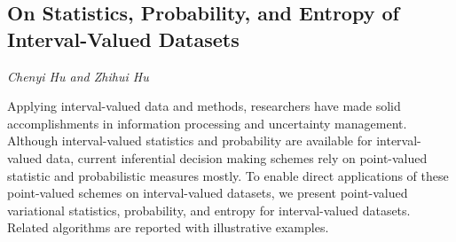 \documentclass[../booklet.tex]{subfiles}
\begin{document}
\subsection[On Statistics, Probability, and Entropy of Interval-Valued Datasets. {\it Chenyi Hu and Zhihui Hu}]{On Statistics, Probability, and Entropy of Interval-Valued Datasets}
 

\begin{center}
  {\it Chenyi Hu and Zhihui Hu}
\end{center}

\vskip 0.8cm


Applying interval-valued data and methods, researchers have made solid accomplishments in  information processing and  uncertainty management. Although interval-valued statistics and probability are available for interval-valued data, current inferential decision making schemes rely on point-valued statistic and probabilistic measures mostly.  To enable direct applications of these point-valued schemes on interval-valued datasets, we present point-valued variational statistics, probability, and entropy for interval-valued datasets.  Related algorithms are reported with illustrative examples.  
\end{document}
